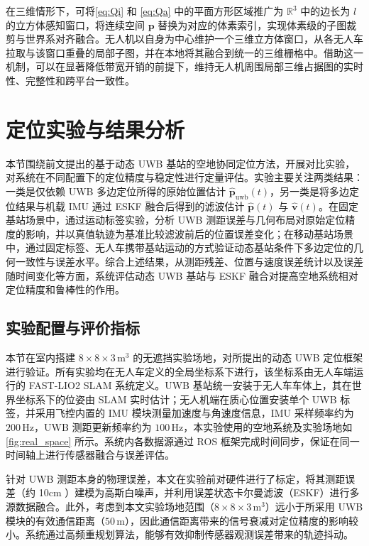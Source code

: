 在三维情形下，可将\autoref{eq:Qi} 和 \autoref{eq:Qa} 中的平面方形区域推广为 $\mathbb{R}^3$ 中的边长为 $l$ 的立方体感知窗口，将连续空间 $\mathbf{p}$ 替换为对应的体素索引，实现体素级的子图裁剪与世界系对齐融合。无人机以自身为中心维护一个三维立方体窗口，从各无人车拉取与该窗口重叠的局部子图，并在本地将其融合到统一的三维栅格中。借助这一机制，可以在显著降低带宽开销的前提下，维持无人机周围局部三维占据图的实时性、完整性和跨平台一致性。

\section{定位实验与结果分析}
\label{sec:localization_result}

本节围绕前文提出的基于动态 UWB 基站的空地协同定位方法，开展对比实验，对系统在不同配置下的定位精度与稳定性进行定量评估。实验主要关注两类结果：一类是仅依赖 UWB 多边定位所得的原始位置估计 $\hat{\mathbf{p}}_{\mathrm{uwb}}(t)$，另一类是将多边定位结果与机载 IMU 通过 ESKF 融合后得到的滤波估计 $\hat{\mathbf{p}}(t)$ 与 $\hat{\mathbf{v}}(t)$。在固定基站场景中，通过运动标签实验，分析 UWB 测距误差与几何布局对原始定位精度的影响，并以真值轨迹为基准比较滤波前后的位置误差变化；在移动基站场景中，通过固定标签、无人车携带基站运动的方式验证动态基站条件下多边定位的几何一致性与误差水平。综合上述结果，从测距残差、位置与速度误差统计以及误差随时间变化等方面，系统评估动态 UWB 基站与 ESKF 融合对提高空地系统相对定位精度和鲁棒性的作用。



\subsection{实验配置与评价指标}

本节在室内搭建 $8\times 8\times 3\,\mathrm{m}^3$ 的无遮挡实验场地，对所提出的动态 UWB 定位框架进行验证。所有实验均在无人车定义的全局坐标系下进行，该坐标系由无人车端运行的 FAST-LIO2 \cite{xu2022fastlio2} SLAM 系统定义。UWB 基站统一安装于无人车车体上，其在世界坐标系下的位姿由 SLAM 实时估计；无人机端在质心位置安装单个 UWB 标签，并采用飞控内置的 IMU 模块测量加速度与角速度信息，IMU 采样频率约为 $200\,\mathrm{Hz}$，UWB 测距更新频率约为 $100\,\mathrm{Hz}$，本实验使用的空地系统及实验场地如\autoref{fig:real_space} 所示。系统内各数据源通过 ROS 框架完成时间同步，保证在同一时间轴上进行传感器融合与误差评估。

针对 UWB 测距本身的物理误差，本文在实验前对硬件进行了标定，将其测距误差（约 10cm ）建模为高斯白噪声，并利用误差状态卡尔曼滤波（ESKF）进行多源数据融合。此外，考虑到本文实验场地范围（$8\times 8\times 3\,\mathrm{m}^3$）远小于所采用 UWB 模块的有效通信距离（$ 50\,\mathrm{m}$），因此通信距离带来的信号衰减对定位精度的影响较小。系统通过高频重规划算法，能够有效抑制传感器观测误差带来的轨迹抖动。

